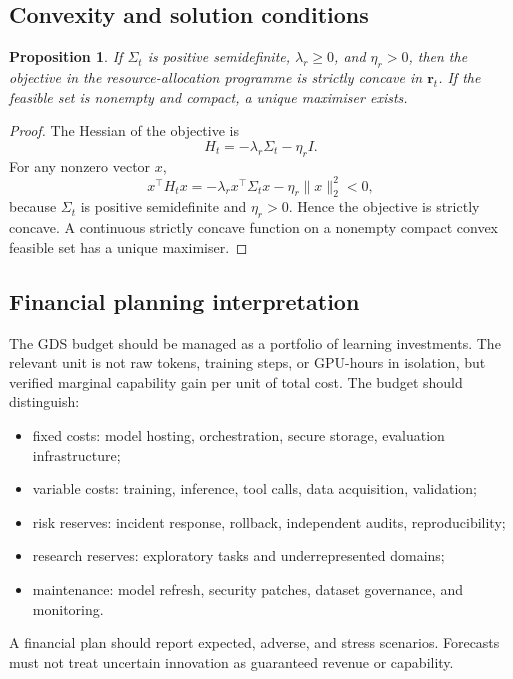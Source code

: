 \documentclass[11pt,a4paper]{article}
\newtheorem{proposition}[definition]{Proposition}
\begin{document}
\subsection{Convexity and solution conditions}

\begin{proposition}
If \(\Sigma_t\) is positive semidefinite, \(\lambda_r\geq0\), and \(\eta_r>0\), then the objective in the resource-allocation programme is strictly concave in \(\mathbf r_t\). If the feasible set is nonempty and compact, a unique maximiser exists.
\end{proposition}
\begin{proof}
The Hessian of the objective is
\begin{equation}
H_t=-\lambda_r\Sigma_t-\eta_r I.
\end{equation}
For any nonzero vector \(x\),
\begin{equation}
x^\top H_tx
=
-\lambda_r x^\top\Sigma_tx-\eta_r\|x\|_2^2<0,
\end{equation}
because \(\Sigma_t\) is positive semidefinite and \(\eta_r>0\). Hence the objective is strictly concave. A continuous strictly concave function on a nonempty compact convex feasible set has a unique maximiser.
\end{proof}

\subsection{Financial planning interpretation}

The GDS budget should be managed as a portfolio of learning investments. The relevant unit is not raw tokens, training steps, or GPU-hours in isolation, but verified marginal capability gain per unit of total cost. The budget should distinguish:
\begin{itemize}
\item fixed costs: model hosting, orchestration, secure storage, evaluation infrastructure;
\item variable costs: training, inference, tool calls, data acquisition, validation;
\item risk reserves: incident response, rollback, independent audits, reproducibility;
\item research reserves: exploratory tasks and underrepresented domains;
\item maintenance: model refresh, security patches, dataset governance, and monitoring.
\end{itemize}
A financial plan should report expected, adverse, and stress scenarios. Forecasts must not treat uncertain innovation as guaranteed revenue or capability.
\end{document}
